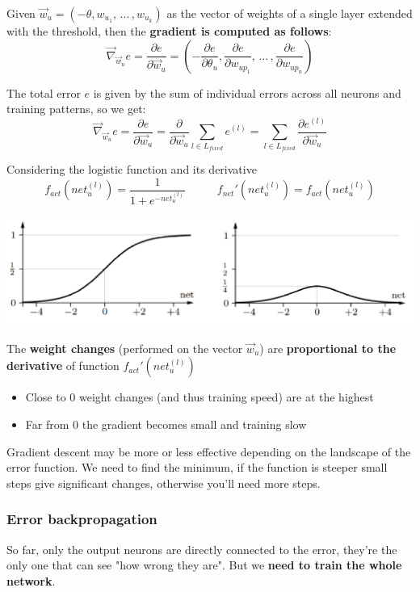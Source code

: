 \documentclass[11pt]{article}
\begin{document}
		Given $\vec{w}_u = (-\theta, w_{u_1}, \, ... \, , w_{u_k})$ as the vector of weights of a single layer extended with the threshold, then the \textbf{gradient is computed as follows}:
		$$ \vec{\nabla}_{\vec{w}_u} e = \frac{\partial e}{\partial \vec{w}_u} = \left(- \frac{\partial e}{\partial \theta_u}, \frac{\partial e}{\partial w_{up_1}}, \, ... \, , \frac{\partial e}{\partial w_{up_n}}\right) $$
		
		The total error $e$ is given by the sum of individual errors across all neurons and training patterns, so we get: 
		$$ \vec{\nabla}_{\vec{w}_u} e = \frac{\partial e}{\partial \vec{w}_u} = \frac{\partial }{\partial \vec{w}_u} \sum_{l \in L_{fixed}} e^{(l)} = \sum_{l \in L_{fixed}} \frac{\partial e^{(l)}}{\partial \vec{w}_u} $$ 
		
		\newpage
		
		Considering the logistic function and its derivative
		$$ f_{act} (net_u^{(l)}) = \frac{1}{1 + e^{- net_u^{(l)}}} \;\;\;\;\;\;\;\;\;\; f_{net}' (net_u^{(l)}) =  f_{act} (net_u^{(l)})$$  
		\begin{center}
			\includegraphics[width=0.9\columnwidth]{img/NN/logfunc1}
		\end{center}
		
		The \textbf{weight changes} (performed on the vector $\vec{w}_u$) are \textbf{proportional to the derivative} of function $f_{act}' (net_u^{(l)})$
		\begin{itemize}
			\item Close to 0 weight changes (and thus training speed) are at the highest
			\item Far from 0 the gradient becomes small and training slow
		\end{itemize}
		
		Gradient descent may be more or less effective depending on the landscape of the error function. We need to find the minimum, if the function is steeper small steps give significant changes, otherwise you'll need more steps.\\
		
		\newpage
		
		\subsubsection{Error backpropagation}
		So far, only the output neurons are directly connected to the error, they're the only one that can see "how wrong they are". But we \textbf{need to train the whole network}.\\
		
\end{document}
